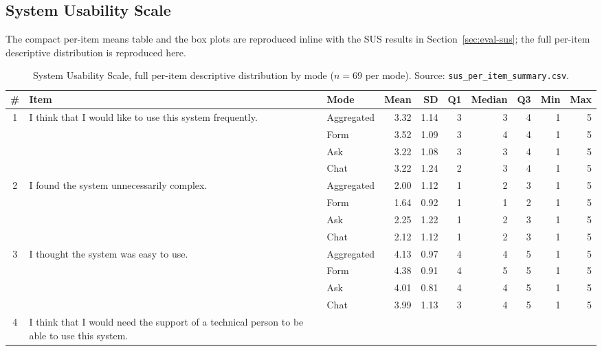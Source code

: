 \subsection{System Usability Scale}
\label{app:items-sus}

The compact per-item means table and the box plots are reproduced
inline with the SUS results in Section~\ref{sec:eval-sus}; the
full per-item descriptive distribution is reproduced here.

\begin{table}
\centering
\caption{System Usability Scale, full per-item descriptive
distribution by mode ($n = 69$ per mode). Source:
\texttt{sus\_per\_item\_summary.csv}.}
\label{tab:sus-per-item-distribution}
\small
\begin{tabularx}{\linewidth}{@{}c X l r r r r r r r@{}}
\toprule
\# & Item & Mode & Mean & SD & Q1 & Median & Q3 & Min & Max \\
\midrule
\multirow{4}{*}{1}  & \multirow{4}{*}{I think that I would like to use this system frequently.}
                    & Aggregated  & 3.32 & 1.14 & 3 & 3 & 4 & 1 & 5 \\
                    & & Form & 3.52 & 1.09 & 3 & 4 & 4 & 1 & 5 \\
                    & & Ask  & 3.22 & 1.08 & 3 & 3 & 4 & 1 & 5 \\
                    & & Chat & 3.22 & 1.24 & 2 & 3 & 4 & 1 & 5 \\
\midrule
\multirow{4}{*}{2}  & \multirow{4}{*}{I found the system unnecessarily complex.}
                    & Aggregated  & 2.00 & 1.12 & 1 & 2 & 3 & 1 & 5 \\
                    & & Form & 1.64 & 0.92 & 1 & 1 & 2 & 1 & 5 \\
                    & & Ask  & 2.25 & 1.22 & 1 & 2 & 3 & 1 & 5 \\
                    & & Chat & 2.12 & 1.12 & 1 & 2 & 3 & 1 & 5 \\
\midrule
\multirow{4}{*}{3}  & \multirow{4}{*}{I thought the system was easy to use.}
                    & Aggregated  & 4.13 & 0.97 & 4 & 4 & 5 & 1 & 5 \\
                    & & Form & 4.38 & 0.91 & 4 & 5 & 5 & 1 & 5 \\
                    & & Ask  & 4.01 & 0.81 & 4 & 4 & 5 & 1 & 5 \\
                    & & Chat & 3.99 & 1.13 & 3 & 4 & 5 & 1 & 5 \\
\midrule
\multirow{4}{*}{4}  & \multirow{4}{*}{I think that I would need the support of a technical person to be able to use this system.}

\end{tabularx}
\end{table}
